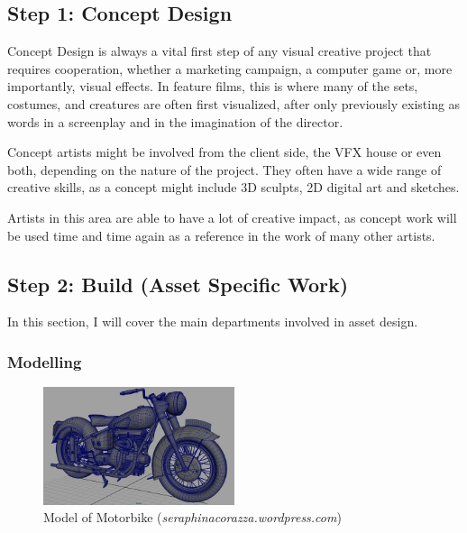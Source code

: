 \hypertarget{step-1-concept-design}{%
\subsection{Step 1: Concept Design}\label{step-1-concept-design}}

Concept Design is always a vital first step of any visual creative project that requires cooperation, whether a marketing campaign, a computer game or, more importantly, visual effects. In feature films, this is where many of the sets, costumes, and creatures are often first visualized, after only previously existing as words in a screenplay and in the imagination of the director.

Concept artists might be involved from the client side, the VFX house or even both, depending on the nature of the project. They often have a wide range of creative skills, as a concept might include 3D sculpts, 2D digital art and sketches.

Artists in this area are able to have a lot of creative impact, as concept work will be used time and time again as a reference in the work of many other artists.

\hypertarget{step-2-build-asset-specific-work}{%
\subsection{Step 2: Build (Asset Specific Work)}\label{step-2-build-asset-specific-work}}

In this section, I will cover the main departments involved in asset design.

\hypertarget{modelling}{%
\subsubsection{Modelling}\label{modelling}}

\begin{figure}
\includegraphics[width=0.5\textwidth,height=\textheight]{./images/wireframe_bike.png}
\caption{Model of Motorbike (\emph{seraphinacorazza.wordpress.com})}
\end{figure}

